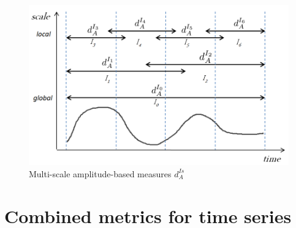 \begin{figure}[h!]
\centering
\includegraphics[width=0.7\linewidth]{images/Intervalles}
\caption{Multi-scale amplitude-based measures $d^{Is}_A$}
\label{fig:Intervalles}
\end{figure}



\section{Combined metrics for time series}

